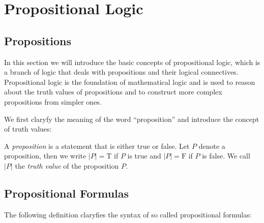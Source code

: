 \section{Propositional Logic}

\subsection{Propositions}

In this section we will introduce the basic concepts of propositional logic, which is a branch of logic that deals with propositions and their logical connectives. Propositional logic is the foundation of mathematical logic and is used to reason about the truth values of propositions and to construct more complex propositions from simpler ones.

We first claryfy the meaning of the word \enquote{proposition} and introduce the concept of truth values:

\begin{definition}
    A \emph{proposition} is a statement that is either true or false. Let $P$ denote a proposition, then we write $|P|=\text{T}$ if $P$ is true and $|P|=\text{F}$ if $P$ is false. We call $|P|$ the \emph{truth value} of the proposition $P$.
\end{definition}


\subsection{Propositional Formulas}

The following definition claryfies the syntax of so called propositional formulas:

\newcommand\provarset{\mathbf{V}}
\newcommand\wffset{\mathbf{WFF}}

